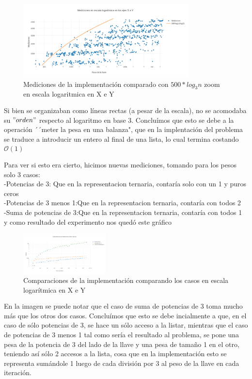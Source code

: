 \documentclass[spanish,12pt]{article}
\begin{document}
\begin{figure}[H]
\centering
\includegraphics[width=0.8\textwidth]{punto2-zoom}
\caption{Mediciones de la implementaci\'on comparado con $500*log_{3}{n}$ zoom en escala logaritmica en X e Y }
\end{figure}
Si bien se organizaban como líneas rectas (a pesar de la escala), no se acomodaba su $"orden"$ respecto al logaritmo en base 3.
Concluímos que esto se debe a la operación ´´meter la pesa en una balanza", que en la implentación del problema se traduce a introducir un entero al final de una lista, lo cual termina costando $\mathcal{O}(1)$

Para ver si esto era cierto, hicimos nuevas mediciones, tomando para los pesos  solo 3 casos: \\
-Potencias de 3: Que en la representacion ternaria, contaría solo con un 1 y puros ceros \\
-Potencias de 3 menos 1:Que en la representacion ternaria, contaría con todos 2\\
-Suma de potencias de 3:Que en la representacion ternaria, contaría con todos 1\\

y como resultado del experimento nos quedó este gráfico
\begin{figure}[H]
\centering
\includegraphics[width=0.4\textwidth]{punto2-comparaciones}
\caption{Comparaciones de la implementaci\'on comparando los casos en escala logarítmica en X e Y }
\end{figure}

En la imagen se puede notar que el caso de suma de potencias de 3 toma mucho más que los otros dos casos. Concluímos que esto se debe incialmente a que, en el caso de sólo potencias de 3, se hace un sólo acceso a la listar, mientras que el caso de potencias de 3 menos 1
tal como sería el resultado al problema, se pone una pesa de la potencia de 3 del lado de la llave y una pesa de tamaño 1 en el otro, teniendo así sólo 2 accesos a la lista, cosa que en la implementación esto se representa sumándole 1 luego de cada división por 3 al peso de la llave en cada iteración.
\end{document}
